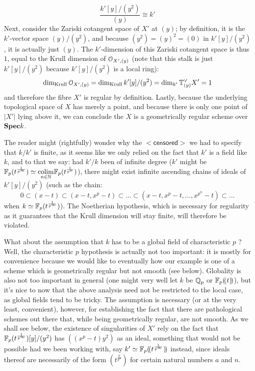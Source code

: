 \begin{example}
\begin{enumerate}
                            $$\frac{k'[y]/(y^2)}{(y)} \cong k'$$
                        Next, consider the Zariski cotangent space of $X'$ at $(y)$; by definition, it is the $k'$-vector space $(y)/(y^2)$, and because $(y^2) = (y)^2 = (0)$ in $k'[y]/(y^2)$, it is actually just $(y)$. The $k'$-dimension of this Zariski cotangent space is thus $1$, equal to the Krull dimension of $\mathcal{O}_{X', (y)}$ (note that this stalk is just $k'[y]/(y^2)$ because $k'[y]/(y^2)$ is a local ring):
                            $$\dim_{\mathrm{Krull}} \mathcal{O}_{X', (y)} = \dim_{\mathrm{Krull}} k'[y]/(y^2) = \dim_{k'} \mathbb{T}^{\vee}_{(y)} X' = 1$$
                        and therefore the fibre $X'$ is regular by definition. Lastly, because the underlying topological space of $X$ has merely a point, and because there is only one point of $|X'|$ lying above it, we can conclude the $X$ is a geometrically regular scheme over $\mathbf{Spec} k$. 
                        
                        The reader might (rightfully) wonder why the $\mathsf{<censored>}$ we had to specify that $k/k'$ is finite, as it seems like we only relied on the fact that $k'$ is a field like $k$, and to that we say: had $k'/k$ been of infinite degree ($k'$ might be $\mathbb{F}_p(t^{\frac{1}{p^{\infty}}}) \simeq \underset{n \in \mathbb{N}}{\operatorname{colim}} \mathbb{F}_p(t^{\frac{1}{p^n}})$), there might exist infinite ascending chains of ideals of $k'[y]/(y^2)$ (such as the chain:
                            $$0 \subset (x - t) \subset (x - t, x^p - t) \subset ... \subset (x - t, x^p - t, ..., x^{p^n} - t) \subset ...$$
                        when $k \simeq \mathbb{F}_p(t^{\frac{1}{p^{\infty}}})$). The Noetherian hypothesis, which is necessary for regularity as it guarantees that the Krull dimension will stay finite, will therefore be violated. 
                        
                        What about the assumption that $k$ has to be a global field of characteristic $p$ ? Well, the characteristic $p$ hypothesis is actually not too important: it is mostly for convenience because we would like to eventually how our example is one of a scheme which is geometrically regular but not smooth (see below). Globality is also not too important in general (one might very well let $k$ be $\mathbb{Q}_p$ or $\mathbb{F}_p(\!(t)\!)$), but it's nice to now that the above analysis need not be restricted to the local case, as global fields tend to be tricky. The assumption is necessary (or at the very least, convenient), however, for establishing the fact that there are pathological schemes out there that, while being geometrically regular, are not smooth. As we shall see below, the existence of singularities of $X'$ rely on the fact that $\mathbb{F}_p(t^{\frac{1}{p^{\infty}}})[y]/(y^2)$ has $\left((x^p - t)y^2\right)$ as an ideal, something that would not be possible had we been working with, say $k' \simeq \mathbb{F}_p(\!(t^{\frac{1}{p^{\infty}}})\!)$ instead, since ideals thereof are necessarily of the form $(t^{\frac{a}{p^n}})$ for certain natural numbers $a$ and $n$. 
                        

\end{enumerate}
\end{example}
